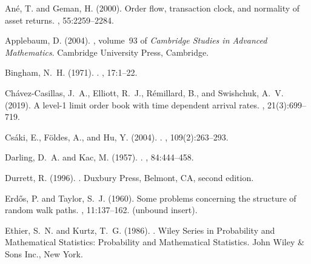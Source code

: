 \documentclass[final]{amsart}
\theoremstyle{definition}
\numberwithin{equation}{section}
\begin{document}
\begin{thebibliography}{}

Ané, T. and Geman, H. (2000).
\newblock Order flow, transaction clock, and normality of asset returns.
, 55:2259--2284.

Applebaum, D. (2004).
, volume~93 of {\em
  Cambridge Studies in Advanced Mathematics}.
\newblock Cambridge University Press, Cambridge.

Bingham, N.~H. (1971).
.
, 17:1--22.

Ch{\'a}vez-Casillas, J.~A., Elliott, R.~J., Rémillard, B., and Swishchuk,
  A.~V. (2019).
\newblock A level-1 limit order book with time dependent arrival rates.
, 21(3):699--719.

Cs\'{a}ki, E., F\"{o}ldes, A., and Hu, Y. (2004).
.
, 109(2):263--293.

Darling, D.~A. and Kac, M. (1957).
.
, 84:444--458.

Durrett, R. (1996).
.
\newblock Duxbury Press, Belmont, CA, second edition.

Erd\H{o}s, P. and Taylor, S.~J. (1960).
\newblock Some problems concerning the structure of random walk paths.
, 11:137--162. (unbound insert).

Ethier, S.~N. and Kurtz, T.~G. (1986).
.
\newblock Wiley Series in Probability and Mathematical Statistics: Probability
  and Mathematical Statistics. John Wiley \& Sons Inc., New York.


\end{thebibliography}
\end{document}
